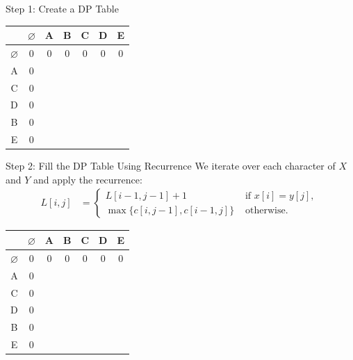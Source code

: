 \documentclass{beamer}
\begin{document}
\begin{frame}{Step 1: Create a DP Table}
    \centering
    \begin{tabular}{|c|c|c|c|c|c|c|} \hline
                      & $\varnothing$ & A & B & C & D & E \\ \hline
        $\varnothing$ &        0      & 0 & 0 & 0 & 0 & 0 \\ \hline
               A      &        0      &   &   &   &   &   \\ \hline
               C      &        0      &   &   &   &   &   \\ \hline
               D      &        0      &   &   &   &   &   \\ \hline
               B      &        0      &   &   &   &   &   \\ \hline
               E      &        0      &   &   &   &   &   \\ \hline
    \end{tabular}
\end{frame}

\begin{frame}{Step 2: Fill the DP Table Using Recurrence}
    We iterate over each character of $X$ and $Y$ and apply the recurrence:
    \begin{equation*}
        \begin{align*}
            L[i, j] &=
                        \begin{cases}
                            L[i - 1, j - 1] + 1 & \text{ if } x[i] = y[j] \text{, } \\
                            \max \{ c[i, j - 1], c[i - 1, j] \} & \text{ otherwise.}
                        \end{cases}
        \end{align*}
    \end{equation*}
    \centering
    \begin{tabular}{|c|c|c|c|c|c|c|} \hline
                      & $\varnothing$ & A & B & C & D & E \\ \hline
        $\varnothing$ &        0      & 0 & 0 & 0 & 0 & 0 \\ \hline
               A      &        0      &   &   &   &   &   \\ \hline
               C      &        0      &   &   &   &   &   \\ \hline
               D      &        0      &   &   &   &   &   \\ \hline
               B      &        0      &   &   &   &   &   \\ \hline
               E      &        0      &   &   &   &   &   \\ \hline
    \end{tabular}
\end{frame}
\end{document}
